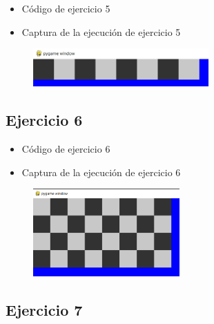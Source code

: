 \documentclass{article}
\begin{document}
	\begin{itemize}
		\item Código de ejercicio 5
	\end{itemize}
	
	\begin{itemize}
		\item Captura de la ejecución de ejercicio 5
	\end{itemize}
	\begin{figure}[H]
		\centering
		\includegraphics[width=0.6\textwidth,keepaspectratio]{imagenes/ejecucion5.png}
	\end{figure}
	\clearpage
	
	\subsection{Ejercicio 6}
	
	\begin{itemize}
		\item Código de ejercicio 6
	\end{itemize}
	
	\begin{itemize}
		\item Captura de la ejecución de ejercicio 6
	\end{itemize}
	\begin{figure}[H]
		\centering
		\includegraphics[width=0.5\textwidth,keepaspectratio]{imagenes/ejecucion6.png}
	\end{figure}
	\clearpage
	\subsection{Ejercicio 7}
	
\end{document}
